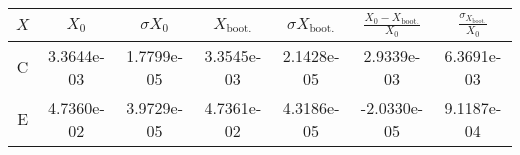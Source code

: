 \documentclass[10pt]{article}
\begin{document}


\begin{center}
\begin{tabular}{ccccccc}
  \(X\)&\(X_0\)&\(\sigma X_0\)&\(X_\text{boot.}\)&\(\sigma X_\text{boot.}\)&\(\frac{X_0 - X_\text{boot.}}{X_0}\)&\(\frac{\sigma_{X_\text{boot.}}}{X_0}\)\\
  \hline
  C & 3.3644e-03 & 1.7799e-05 & 3.3545e-03 & 2.1428e-05 & 2.9339e-03 & 6.3691e-03\\
  E & 4.7360e-02 & 3.9729e-05 & 4.7361e-02 & 4.3186e-05 & -2.0330e-05 & 9.1187e-04
\end{tabular}
\label{Tab:1.1}
\end{center}
\end{document}
